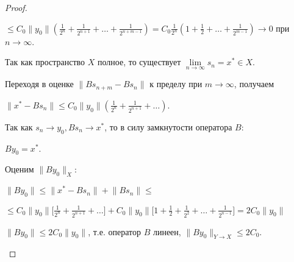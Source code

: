 \documentclass[12pt,a4paper,titlepage,oneside]{book}
\theoremstyle{definition}
\theoremstyle{plain}
\theoremstyle{break}
\theoremstyle{remark}
\theoremstyle{remark}
\theoremstyle{remark}
\theoremstyle{remark}
\theoremstyle{plain}
\theoremstyle{plain}
\begin{document}
\begin{proof}
\begin{enumerate}
\begin{center}
$\leqslant C_0 \lVert y_0 \rVert (\frac{1}{2^n} + \frac{1}{2^{n+1}}+\ldots+\frac{1}{2^{n+m-1}})=C_0 \frac{1}{2^n} (1 + \frac{1}{2}+\ldots+\frac{1}{2^{m-1}}) \to 0$ при $n \to \infty$.
\end{center}

Так как пространство $X$ полное, то существует $\lim \limits_{n \to \infty} s_n=x^* \in X$.

Переходя в оценке $ \lVert B s_{n+m}-B s_n \rVert$ к пределу при $m \to \infty$, получаем

\begin{center}
$ \lVert x^*-B s_n \rVert \leqslant C_0 \lVert y_0\rVert (\frac{1}{2^n} + \frac{1}{2^{n+1}}+\ldots)$.
\end{center}

Так как $s_n \to y_0, B s_n \to x^*$, то в силу замкнутости оператора $B$: 

\begin{center}
$B y_0=x^* $.
\end{center}

Оценим $\lVert B y_0 \rVert _X$:

\begin{center}
$\lVert B y_0 \rVert \leqslant \lVert x^* - B s_n \rVert + \lVert B s_n \rVert \leqslant$ 
\end{center}

\begin{center}
$\leqslant C_0 \lVert y_0\rVert \Big[ \frac{1}{2^n} + \frac{1}{2^{n+1}}+\ldots \Big] + C_0 \lVert y_0\rVert \Big[ 1+\frac{1}{2} +\frac{1}{2^2}+ \ldots+\frac{1}{2^{n-1}} \Big]= 2 C_0 \lVert y_0\rVert$
\end{center}

$\lVert B y_0 \rVert \leqslant 2 C_0 \lVert y_0\rVert$, т.е. оператор $B$ линеен, $ \lVert B y_0 \rVert _{Y \to X} \leqslant 2 C_0$.
\qedhere
\end{enumerate}
\end{proof}
\end{document}
